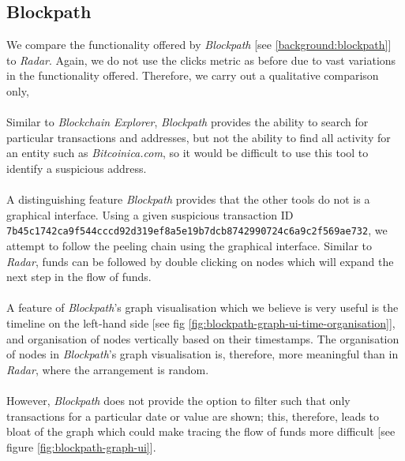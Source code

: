 \subsection{Blockpath}
We compare the functionality offered by \textit{Blockpath} [see \ref{background:blockpath}] to \textit{Radar}. Again, we do not use the clicks metric as before due to vast variations in the functionality offered. Therefore, we carry out a qualitative comparison only,
\\\\
Similar to \textit{Blockchain Explorer}, \textit{Blockpath} provides the ability to search for particular transactions and addresses, but not the ability to find all activity for an entity such as \textit{Bitcoinica.com}, so it would be difficult to use this tool to identify a suspicious address. 
\\\\
A distinguishing feature \textit{Blockpath} provides that the other tools do not is a graphical interface. Using a given suspicious transaction ID \\\texttt{7b45c1742ca9f544cccd92d319ef8a5e19b7dcb8742990724c6a9c2f569ae732}, we attempt to follow the peeling chain using the graphical interface. Similar to \textit{Radar}, funds can be followed by double clicking on nodes which will expand the next step in the flow of funds.
\\\\
A feature of \textit{Blockpath}'s graph visualisation which we believe is very useful is the timeline on the left-hand side [see fig \ref{fig:blockpath-graph-ui-time-organisation}], and organisation of nodes vertically based on their timestamps. The organisation of nodes in \textit{Blockpath}'s graph visualisation is, therefore, more meaningful than in \textit{Radar}, where the arrangement is random. 
\\\\
However, \textit{Blockpath} does not provide the option to filter such that only transactions for a particular date or value are shown; this, therefore, leads to bloat of the graph which could make tracing the flow of funds more difficult [see figure \ref{fig:blockpath-graph-ui}]. 

